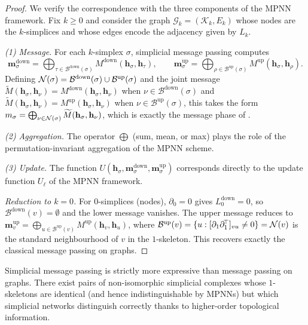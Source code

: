 \begin{proof}
We verify the correspondence with the three components of the MPNN framework.
Fix $k \ge 0$ and consider the graph $\mathcal{G}_k = (\mathcal{K}_k, E_k)$ whose
nodes are the $k$-simplices and whose edges encode the adjacency given by $L_k$.

\emph{(1) Message.} For each $k$-simplex $\sigma$, simplicial message passing
computes
\[
  \mathbf{m}_\sigma^{\mathrm{down}}
    = \bigoplus_{\tau \in \mathcal{B}^{\mathrm{down}}(\sigma)}
      M^{\mathrm{down}}(\mathbf{h}_\sigma, \mathbf{h}_\tau),
  \qquad
  \mathbf{m}_\sigma^{\mathrm{up}}
    = \bigoplus_{\rho \in \mathcal{B}^{\mathrm{up}}(\sigma)}
      M^{\mathrm{up}}(\mathbf{h}_\sigma, \mathbf{h}_\rho).
\]
Defining $\mathcal{N}(\sigma) = \mathcal{B}^{\mathrm{down}}(\sigma) \cup
\mathcal{B}^{\mathrm{up}}(\sigma)$ and the joint message
$\widetilde{M}(\mathbf{h}_\sigma, \mathbf{h}_\nu) =
M^{\mathrm{down}}(\mathbf{h}_\sigma, \mathbf{h}_\nu)$ when
$\nu \in \mathcal{B}^{\mathrm{down}}(\sigma)$ and
$\widetilde{M}(\mathbf{h}_\sigma, \mathbf{h}_\nu) =
M^{\mathrm{up}}(\mathbf{h}_\sigma, \mathbf{h}_\nu)$ when
$\nu \in \mathcal{B}^{\mathrm{up}}(\sigma)$, this takes the form
$m_\sigma = \bigoplus_{\nu \in \mathcal{N}(\sigma)} \widetilde{M}(\mathbf{h}_\sigma,
\mathbf{h}_\nu)$, which is exactly the message phase of .

\emph{(2) Aggregation.} The operator $\bigoplus$ (sum, mean, or max) plays the
role of the permutation-invariant aggregation of the MPNN scheme.

\emph{(3) Update.} The function
$U(\mathbf{h}_\sigma, \mathbf{m}_\sigma^{\mathrm{down}},
\mathbf{m}_\sigma^{\mathrm{up}})$ corresponds directly to the update function
$U_\ell$ of the MPNN framework.

\emph{Reduction to $k = 0$.} For $0$-simplices (nodes), $\partial_0 = 0$ gives
$L_0^{\mathrm{down}} = 0$, so $\mathcal{B}^{\mathrm{down}}(v) = \emptyset$ and the
lower message vanishes. The upper message reduces to
$\mathbf{m}_v^{\mathrm{up}} = \bigoplus_{u \in \mathcal{B}^{\mathrm{up}}(v)}
M^{\mathrm{up}}(\mathbf{h}_v, \mathbf{h}_u)$, where
$\mathcal{B}^{\mathrm{up}}(v) = \{u : [\partial_1 \partial_1^{\!\top}]_{vu} \neq 0\}
= \mathcal{N}(v)$ is the standard neighbourhood of $v$ in the $1$-skeleton. This recovers
exactly the classical message passing on graphs. \qedhere
\end{proof}

\begin{proposition}
\label{prop:priors:simplicial-expressivity}
Simplicial message passing is strictly more expressive than message passing on
graphs. There exist pairs of non-isomorphic simplicial complexes whose
$1$-skeletons are identical (and hence indistinguishable by MPNNs) but which
simplicial networks distinguish correctly thanks to higher-order topological
information.
\end{proposition}

